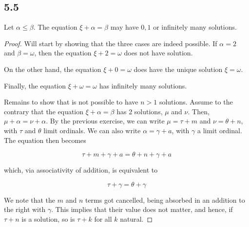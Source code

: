 \subsection*{5.5} Let $\alpha \leq \beta$. The equation $\xi + \alpha = \beta$ may have $0, 1$ or infinitely many solutions.

\begin{proof}
    Will start by showing that the three cases are indeed possible. If $\alpha = 2$ and $\beta = \omega$, then the equation $\xi + 2 = \omega$ does not have solution.

    On the other hand, the equation $\xi + 0 = \omega$ does have the unique solution $\xi = \omega$.

    Finally, the equation $\xi + \omega = \omega$ has infinitely many solutions.

    Remains to show that is not possible to have $n > 1$ solutions. Assume to the contrary that the equation $\xi + \alpha = \beta$ has 2 solutions, $\mu$ and $\nu$.
    Then, $\mu + \alpha = \nu + \alpha$. By the previous exercise, we can write $\mu = \tau + m$ and $\nu = \theta + n$, with $\tau$ and $\theta$ limit ordinals.
    We can also write $\alpha = \gamma + a$, with $\gamma$ a limit ordinal. The equation then becomes

    $$\tau + m + \gamma + a = \theta + n + \gamma + a$$

    which, via associativity of addition, is equivalent to

    $$\tau + \gamma = \theta + \gamma$$

    We note that the $m$ and $n$ terms got cancelled, being absorbed in an addition to the right with $\gamma$. This implies that their value does not matter, and hence, if $\tau + n$ is a solution, so is $\tau + k$ for all $k$ natural.
\end{proof}

